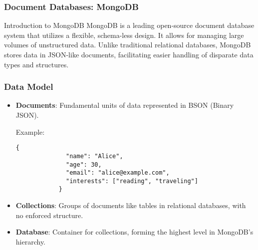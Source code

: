 \documentclass[aspectratio=169]{beamer}
\begin{document}
\begin{frame}[fragile]
    \frametitle{Document Databases: MongoDB}
    \begin{block}{Introduction to MongoDB}
        MongoDB is a leading open-source document database system that utilizes a flexible, schema-less design. It allows for managing large volumes of unstructured data. Unlike traditional relational databases, MongoDB stores data in JSON-like documents, facilitating easier handling of disparate data types and structures.
    \end{block}
\end{frame}

\begin{frame}[fragile]
    \frametitle{Data Model}
    \begin{itemize}
        \item \textbf{Documents}: Fundamental units of data represented in BSON (Binary JSON).
            \begin{block}{Example:}
            \begin{lstlisting}[basicstyle=\small\ttfamily]
            {
              "name": "Alice",
              "age": 30,
              "email": "alice@example.com",
              "interests": ["reading", "traveling"]
            }
            \end{lstlisting}
            \end{block}
        \item \textbf{Collections}: Groups of documents like tables in relational databases, with no enforced structure.
        \item \textbf{Database}: Container for collections, forming the highest level in MongoDB's hierarchy.
    \end{itemize}
\end{frame}
\end{document}
